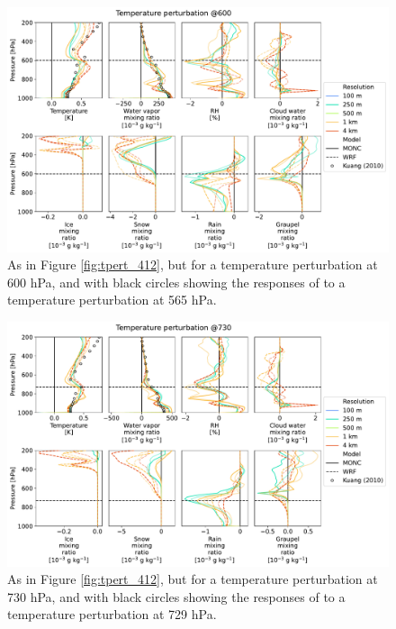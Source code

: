 \documentclass[draft]{agujournal2019}
\begin{document}
\begin{figure}[pth]
    \noindent\includegraphics[width=\textwidth]{figures/pert_diffs_T_0.5_@600}
    \caption{As in Figure \ref{fig:tpert_412}, but for a temperature
    perturbation at 600 hPa, and with black circles showing the responses of
     to a temperature perturbation at 565 hPa.}
    \label{fig:tpert_600}
\end{figure}

\begin{figure}[pth]
    \noindent\includegraphics[width=\textwidth]{figures/pert_diffs_T_0.5_@730}
    \caption{As in Figure \ref{fig:tpert_412}, but for a temperature
    perturbation at 730 hPa, and with black circles showing the responses of
     to a temperature perturbation at 729 hPa.}
    \label{fig:tpert_730}
\end{figure}
\end{document}
